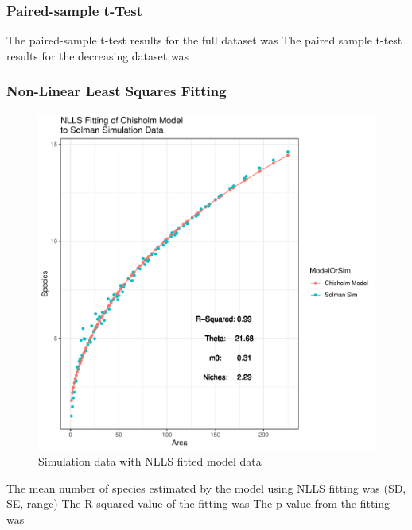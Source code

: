 \documentclass{article}
\begin{document}
\subsubsection{Paired-sample t-Test}
The paired-sample t-test results for the full dataset was
The paired sample t-test results for the decreasing dataset was

\subsubsection{Non-Linear Least Squares Fitting}

\begin{figure}
\centering
  \includegraphics[scale=0.5]{../../Results/Simulation/NLLSFit.pdf}
  \caption{Simulation data with NLLS fitted model data}
  \label{fig:NLLS}
\end{figure}

The mean number of species estimated by the model using NLLS fitting was (SD, SE, range)
The R-squared value of the fitting was 
The p-value from the fitting was 
\end{document}
